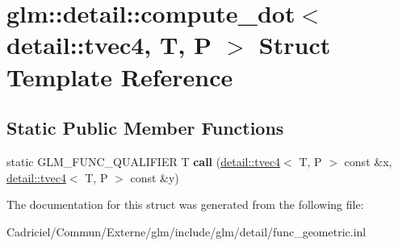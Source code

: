 \hypertarget{structglm_1_1detail_1_1compute__dot_3_01detail_1_1tvec4_00_01_t_00_01_p_01_4}{}\section{glm\+:\+:detail\+:\+:compute\+\_\+dot$<$ detail\+:\+:tvec4, T, P $>$ Struct Template Reference}
\label{structglm_1_1detail_1_1compute__dot_3_01detail_1_1tvec4_00_01_t_00_01_p_01_4}
\subsection*{Static Public Member Functions}
\begin{DoxyCompactItemize}
\item 
static G\+L\+M\+\_\+\+F\+U\+N\+C\+\_\+\+Q\+U\+A\+L\+I\+F\+I\+ER T {\bfseries call} (\hyperlink{structglm_1_1detail_1_1tvec4}{detail\+::tvec4}$<$ T, P $>$ const \&x, \hyperlink{structglm_1_1detail_1_1tvec4}{detail\+::tvec4}$<$ T, P $>$ const \&y)\hypertarget{structglm_1_1detail_1_1compute__dot_3_01detail_1_1tvec4_00_01_t_00_01_p_01_4_acc311c73135c616fd126c216454759e2}{}\label{structglm_1_1detail_1_1compute__dot_3_01detail_1_1tvec4_00_01_t_00_01_p_01_4_acc311c73135c616fd126c216454759e2}

\end{DoxyCompactItemize}


The documentation for this struct was generated from the following file\+:\begin{DoxyCompactItemize}
\item 
Cadriciel/\+Commun/\+Externe/glm/include/glm/detail/func\+\_\+geometric.\+inl\end{DoxyCompactItemize}
